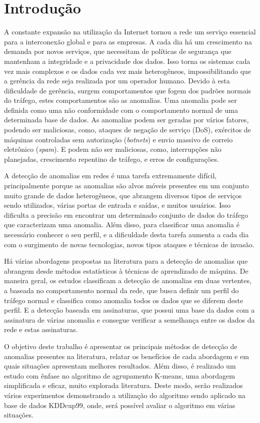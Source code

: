 \chapter{Introdução}%
\indent A constante expansão na utilização da Internet tornou a rede um serviço essencial para a interconexão global e para as empresas. A cada dia há um crescimento na demanda por  novos serviços, que necessitam de políticas de segurança que mantenham a integridade e a privacidade dos dados. Isso torna os sistemas cada vez mais complexos e os dados cada vez mais heterogêneos, impossibilitando que a gerência da rede seja realizada por um operador humano. Devido à esta dificuldade de gerência, surgem comportamentos que fogem dos padrões normais do tráfego, estes comportamentos são as anomalias. Uma anomalia pode ser definida como uma não conformidade com o comportamento normal de uma determinada base de dados. As anomalias podem ser geradas por vários fatores, podendo ser maliciosas, como, ataques de negação de serviço (DoS), exércitos de máquinas controladas sem autorização (\textit{botnets}) e envio massivo de correio eletrônico (\textit{spam}). E podem não ser maliciosas, como, interrupções não planejadas, crescimento repentino de tráfego, e erros de configurações.

\indent A detecção de anomalias em redes é uma tarefa extremamente difícil, principalmente porque as anomalias são alvos móveis presentes em um conjunto muito grande de dados heterogêneos, que abrangem diversos tipos de serviços sendo utilizados, várias portas de entrada e saídas, e muitos usuários. Isso dificulta a precisão em encontrar um determinado conjunto de dados do tráfego que caracterizam uma anomalia. Além disso, para classificar uma anomalia é necessário conhecer o seu perfil, e a dificuldade desta tarefa aumenta a cada dia com o surgimento de novas tecnologias, novos tipos ataques e técnicas de invasão.

\indent Há várias abordagens propostas na literatura para a detecção de anomalias que abrangem desde métodos estatísticos à técnicas de aprendizado de máquina. De maneira geral, os estudos classificam a detecção de anomalias em duas vertentes, a baseada no comportamento normal da rede, que busca definir um perfil do tráfego normal e classifica como anomalia todos os dados que se diferem deste perfil. E a detecção baseada em assinaturas, que possui uma base da dados com a assinatura de várias anomalia e consegue verificar a semelhança entre os dados da rede e estas assinaturas.

\indent O objetivo deste trabalho é apresentar os principais métodos de detecção de anomalias presentes na literatura, relatar os benefícios de cada abordagem e em quais situações apresentam melhores resultados. Além disso, é realizado um estudo com ênfase no algoritmo de agrupamento K-means, uma abordagem simplificada e eficaz, muito explorada literatura. Deste modo, serão realizados vários experimentos demonstrando a utilização do algoritmo sendo aplicado na base de dados KDDcup99, onde, será possível avaliar o algoritmo em várias situações.




